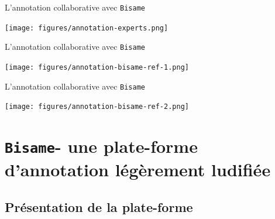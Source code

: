 \documentclass[french]{beamer}
\newcommand{\tool}[1]{\texttt{#1}\xspace}
\begin{document}



\begin{frame}{L'annotation collaborative avec \tool{Bisame}}
  \begin{center}
    \texttt{[image: figures/annotation-experts.png]}
  \end{center}
    \hfill\cite{Fort2012} 
\end{frame}

\begin{frame}{L'annotation collaborative avec \tool{Bisame}}
  \begin{center}
    \texttt{[image: figures/annotation-bisame-ref-1.png]}
  \end{center}
  \hfill\cite{Fort2012}
\end{frame}


\begin{frame}{L'annotation collaborative avec \tool{Bisame}}
  \begin{center}
    \texttt{[image: figures/annotation-bisame-ref-2.png]}
  \end{center}
    \hfill\cite{Fort2012} 
\end{frame}



\section{\tool{Bisame}\thinspace - une plate-forme d'annotation légèrement ludifiée}

\subsection{Présentation de la plate-forme}
\end{document}
